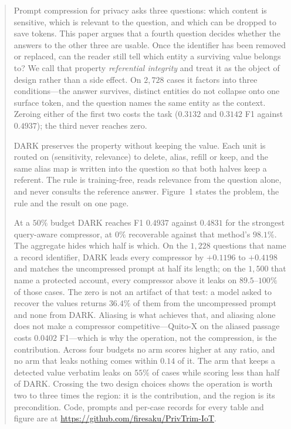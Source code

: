 \begin{abstract}
Prompt compression for privacy asks three questions: which content is sensitive, which is
relevant to the question, and which can be dropped to save tokens. This paper argues that a
fourth question decides whether the answers to the other three are usable. Once the identifier
has been removed or replaced, can the reader still tell which entity a surviving value belongs
to? We call that property \emph{referential integrity} and treat it as the object of design
rather than a side effect. On $2{,}728$ cases it factors into three conditions---the answer
survives, distinct entities do not collapse onto one surface token, and the question names the
same entity as the context. Zeroing either of the first two costs the task ($0.3132$ and $0.3142$
F1 against $0.4937$); the third never reaches zero.

\textsc{DARK} preserves the property without keeping the value. Each unit is routed on
(sensitivity, relevance) to delete, alias, refill or keep, and the same alias map is written
into the question so that both halves keep a referent. The rule is training-free, reads
relevance from the question alone, and never consults the reference answer. Figure~1 states the
problem, the rule and the result on one page.

At a $50\%$ budget \textsc{DARK} reaches F1 $0.4937$ against $0.4831$ for the strongest
query-aware compressor, at $0\%$ recoverable against that method's $98.1\%$. The aggregate hides which half is which. On the $1{,}228$
questions that name a record identifier, \textsc{DARK} leads every compressor by $+0.1196$ to
$+0.4198$ and matches the uncompressed prompt at half its length; on the $1{,}500$ that name a
protected account, every compressor above it leaks on $89.5$--$100\%$ of those cases.
The zero is not an artifact of that test: a model asked to recover the values returns
$36.4\%$ of them from the uncompressed prompt and none from \textsc{DARK}. Aliasing is what achieves that, and
aliasing alone does not make a compressor competitive---Quito-X on the aliased passage costs
$0.0402$ F1---which is why the operation, not the compression, is the contribution.
Across four budgets no arm scores higher at any ratio, and no arm that leaks nothing comes within
$0.14$ of it. The arm that keeps a detected value verbatim leaks on $55\%$ of cases while
scoring less than half of \textsc{DARK}.
Crossing the two design choices shows the operation is worth two to three times the region: it is the
contribution, and the region is its precondition. Code, prompts and
per-case records for every table and figure are at
\url{https://github.com/firesaku/PrivTrim-IoT}.
\end{abstract}
